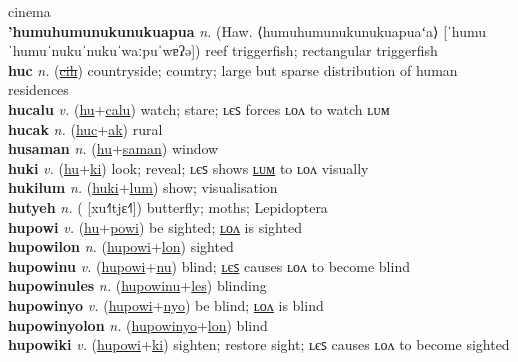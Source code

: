 cinema \label{humocakilyot} \\
\textbf{'humuhumunukunukuapua} \textit{n.} (Haw. ⟨humuhumunukunukuapuaʻa⟩ [ˈhumuˈhumuˈnukuˈnukuˈwaːpuˈwɐʔə])
reef triggerfish; rectangular triggerfish \label{'humuhumunukunukuapua} \\
\textbf{huc} \textit{n.} (\hyperref[cih]{\sout{cih}})
countryside; country; large but sparse distribution of human residences \label{huc} \\
\textbf{hucalu} \textit{v.} (\hyperref[hu]{hu}+\hyperref[calu]{calu})
watch; stare; ʟєꜱ forces ʟᴏᴧ to watch ʟᴜᴍ \label{hucalu} \\
\textbf{hucak} \textit{n.} (\hyperref[huc]{huc}+\hyperref[ak]{ak})
rural \label{hucak} \\
\textbf{husaman} \textit{n.} (\hyperref[hu]{hu}+\hyperref[saman]{saman})
window \label{husaman} \\
\textbf{huki} \textit{v.} (\hyperref[hu]{hu}+\hyperref[ki]{ki})
look; reveal; ʟєꜱ shows \hyperref[hukilum]{ʟᴜᴍ} to ʟᴏᴧ visually \label{huki} \\
\textbf{hukilum} \textit{n.} (\hyperref[huki]{huki}+\hyperref[lum]{lum})
show; visualisation \label{hukilum} \\
\textbf{hutyeh} \textit{n.} ( [xu˧˥tjɛ˧˥])
butterfly; moths; Lepidoptera \label{hutyeh} \\
\textbf{hupowi} \textit{v.} (\hyperref[hu]{hu}+\hyperref[powi]{powi})
be sighted; \hyperref[hupowilon]{ʟᴏᴧ} is sighted \label{hupowi} \\
\textbf{hupowilon} \textit{n.} (\hyperref[hupowi]{hupowi}+\hyperref[lon]{lon})
sighted \label{hupowilon} \\
\textbf{hupowinu} \textit{v.} (\hyperref[hupowi]{hupowi}+\hyperref[nu]{nu})
blind; \hyperref[hupowinules]{ʟєꜱ} causes ʟᴏᴧ to become blind \label{hupowinu} \\
\textbf{hupowinules} \textit{n.} (\hyperref[hupowinu]{hupowinu}+\hyperref[les]{les})
blinding \label{hupowinules} \\
\textbf{hupowinyo} \textit{v.} (\hyperref[hupowi]{hupowi}+\hyperref[nyo]{nyo})
be blind; \hyperref[hupowinyolon]{ʟᴏᴧ} is blind \label{hupowinyo} \\
\textbf{hupowinyolon} \textit{n.} (\hyperref[hupowinyo]{hupowinyo}+\hyperref[lon]{lon})
blind \label{hupowinyolon} \\
\textbf{hupowiki} \textit{v.} (\hyperref[hupowi]{hupowi}+\hyperref[ki]{ki})
sighten; restore sight; ʟєꜱ causes ʟᴏᴧ to become sighted \label{hupowiki} \\
